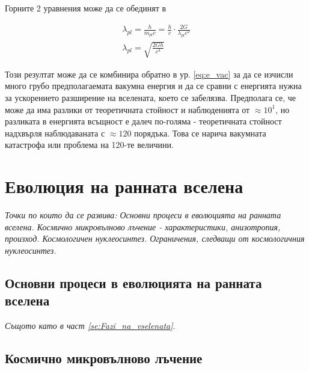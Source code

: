 \documentclass[a4paper,12pt]{article}
\begin{document}
Горните 2 уравнения може да се обединят в

\begin{gather}
    \lambda_{pl} = \frac{h}{m_{pl}c} =  \frac{h}{c} \cdot \frac{2G}{\lambda_{pl} c^2}\\
    \lambda_{pl} = \sqrt{\frac{2Gh}{c^3}}
\end{gather}

Този резултат може да се комбинира обратно в ур. \eqref{eq:e_vac} за да се изчисли много грубо предполагаемата вакумна енергия и да се сравни с енергията нужна за ускорението разширение на вселената, което се забелязва. Предполага се, че може да има разлики от теоретичната стойност и наблюденията от $\approx 10^1$, но разликата в енергията всъщност е далеч по-голяма - теоретичната стойност надхвърля наблюдаваната с $\approx 120$ порядъка. Това се нарича вакумната катастрофа или проблема на 120-те величини.



\section{Еволюция на ранната вселена}
\textit{Точки по които да се развива: Основни процеси в еволюцията на ранната вселена. Космично микровълново лъчение - характеристики, анизотропия, произход. Космологичен нуклеосинтез. Ограничения, следващи от космологичния нуклеосинтез.}

\subsection{Основни процеси в еволюцията на ранната вселена}
\textit{Същото като в част \ref{se:Fazi_na_vselenata}}. 



\subsection{Космично микровълново лъчение}
\end{document}
